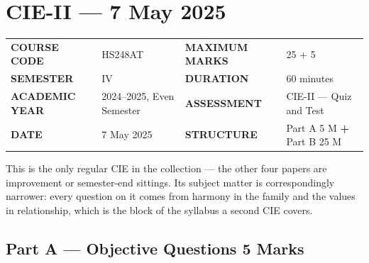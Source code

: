 \documentclass[11pt,a4paper,oneside]{book}
\makeatletter
\newenvironment{papermeta}
  {\begin{tcolorbox}[colback=panel,colframe=rulegrey,boxrule=0.8pt,
     sharp corners,left=8pt,right=8pt,top=7pt,bottom=7pt,
     before skip=4pt,after skip=10pt]
   \renewcommand{\arraystretch}{1.25}%
   \begin{tabular}{@{}P{24mm}P{48mm}@{\hspace{6mm}}P{24mm}P{46mm}@{}}}
  {\end{tabular}\end{tcolorbox}}
\newcommand{\mk}[1]{{\footnotesize\sffamily\bfseries\color{slatelight}%
  \MakeUppercase{#1}}}
\newcommand{\mv}[1]{{\color{slate}#1}}
\makeatother
\begin{document}
\chapter{CIE-II --- 7 May 2025}

\begin{papermeta}
\mk{Course code}   & \mv{HS248AT}                    &
\mk{Maximum marks} & \mv{25 $+$ 5}                    \\
\mk{Semester}      & \mv{IV}                          &
\mk{Duration}      & \mv{60 minutes}                  \\
\mk{Academic year} & \mv{2024--2025, Even Semester}   &
\mk{Assessment}    & \mv{CIE-II --- Quiz and Test}    \\
\mk{Date}          & \mv{7 May 2025}                  &
\mk{Structure}     & \mv{Part A 5 M \textbf{+} Part B 25 M} \\
\end{papermeta}

This is the only regular CIE in the collection --- the other four papers are
improvement or semester-end sittings. Its subject matter is correspondingly
narrower: every question on it comes from harmony in the family and the values
in relationship, which is the block of the syllabus a second CIE covers.

\section[Part A --- Objective Questions]{Part A --- Objective Questions
  \hfill 5 Marks}
\end{document}
